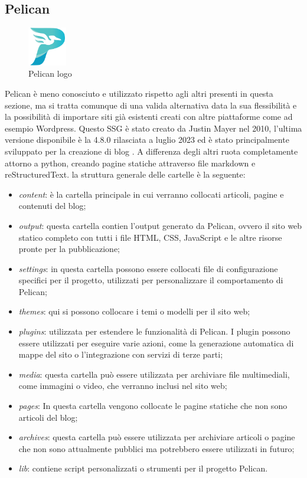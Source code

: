 \documentclass[target=bach,aauheader=]{thud}
\begin{document}
\subsection{Pelican}

\begin{figure}
    \centering
    \includegraphics[width = 0.15\textwidth]{images/pelican_logo.png}
    \caption{Pelican logo}
\end{figure}

Pelican è meno conosciuto e utilizzato rispetto agli altri presenti in questa sezione, ma si tratta comunque di una valida alternativa data la sua flessibilità e la possibilità di importare siti già esistenti creati con altre piattaforme come ad esempio Wordpress.
Questo SSG è stato creato da Justin Mayer nel 2010, l'ultima versione disponibile è la 4.8.0 rilasciata a luglio 2023 ed è stato principalmente sviluppato per la creazione di blog \cite{pelican-site}.  
A differenza degli altri ruota completamente attorno a python, creando pagine statiche attraverso file markdown e reStructuredText. \newline
la struttura generale delle cartelle è la seguente: 
\begin{itemize}
    \item \textit{content}: è la cartella principale in cui verranno collocati articoli, pagine e contenuti del blog;
    \item \textit{output}: questa cartella contien l'output generato da Pelican, ovvero il sito web statico completo con tutti i file HTML, CSS, JavaScript e le altre risorse pronte per la pubblicazione;
    \item \textit{settings}: in questa cartella possono essere collocati file di configurazione specifici per il progetto, utilizzati per personalizzare il comportamento di Pelican;
    \item \textit{themes}: qui si possono collocare i temi o modelli per il sito web;
    \item \textit{plugins}: utilizzata per estendere le funzionalità di Pelican. I plugin possono essere utilizzati per eseguire varie azioni, come la generazione automatica di mappe del sito o l'integrazione con servizi di terze parti;
    \item \textit{media}: questa cartella può essere utilizzata per archiviare file multimediali, come immagini o video, che verranno inclusi nel sito web;
    \item \textit{pages}: In questa cartella vengono collocate le pagine statiche che non sono articoli del blog;
    \item \textit{archives}: questa cartella può essere utilizzata per archiviare articoli o pagine che non sono attualmente pubblici ma potrebbero essere utilizzati in futuro;
    \item \textit{lib}: contiene script personalizzati o strumenti per il progetto Pelican.
\end{itemize}
\end{document}
